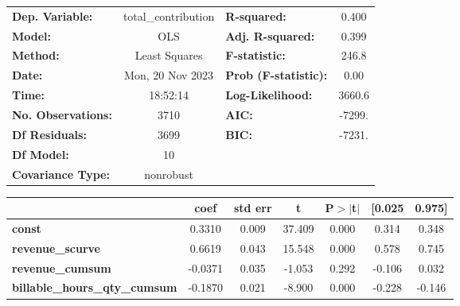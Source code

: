 \begin{center}
\begin{tabular}{lclc}
\toprule
\textbf{Dep. Variable:}                  & total\_contribution & \textbf{  R-squared:         } &     0.400   \\
\textbf{Model:}                          &         OLS         & \textbf{  Adj. R-squared:    } &     0.399   \\
\textbf{Method:}                         &    Least Squares    & \textbf{  F-statistic:       } &     246.8   \\
\textbf{Date:}                           &   Mon, 20 Nov 2023  & \textbf{  Prob (F-statistic):} &     0.00    \\
\textbf{Time:}                           &       18:52:14      & \textbf{  Log-Likelihood:    } &    3660.6   \\
\textbf{No. Observations:}               &          3710       & \textbf{  AIC:               } &    -7299.   \\
\textbf{Df Residuals:}                   &          3699       & \textbf{  BIC:               } &    -7231.   \\
\textbf{Df Model:}                       &            10       & \textbf{                     } &             \\
\textbf{Covariance Type:}                &      nonrobust      & \textbf{                     } &             \\
\bottomrule
\end{tabular}
\begin{tabular}{lcccccc}
                                         & \textbf{coef} & \textbf{std err} & \textbf{t} & \textbf{P$> |$t$|$} & \textbf{[0.025} & \textbf{0.975]}  \\
\midrule
\textbf{const}                           &       0.3310  &        0.009     &    37.409  &         0.000        &        0.314    &        0.348     \\
\textbf{revenue\_scurve}                 &       0.6619  &        0.043     &    15.548  &         0.000        &        0.578    &        0.745     \\
\textbf{revenue\_cumsum}                 &      -0.0371  &        0.035     &    -1.053  &         0.292        &       -0.106    &        0.032     \\
\textbf{billable\_hours\_qty\_cumsum}    &      -0.1870  &        0.021     &    -8.900  &         0.000        &       -0.228    &       -0.146     \\

\end{tabular}
\end{center}
